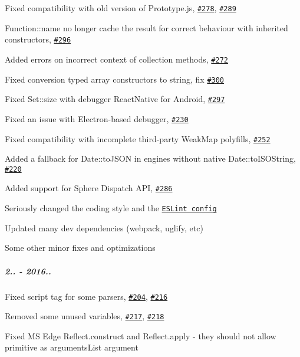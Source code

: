 \begin{DoxyItemize}
\item Fixed compatibility with old version of Prototype.\+js, \href{https://github.com/zloirock/core-js/issues/278}{\tt \#278}, \href{https://github.com/zloirock/core-js/issues/289}{\tt \#289}
\item {\ttfamily Function\+::name} no longer cache the result for correct behaviour with inherited constructors, \href{https://github.com/zloirock/core-js/issues/296}{\tt \#296}
\item Added errors on incorrect context of collection methods, \href{https://github.com/zloirock/core-js/issues/272}{\tt \#272}
\item Fixed conversion typed array constructors to string, fix \href{https://github.com/zloirock/core-js/issues/300}{\tt \#300}
\item Fixed {\ttfamily Set\+::size} with debugger React\+Native for Android, \href{https://github.com/zloirock/core-js/issues/297}{\tt \#297}
\item Fixed an issue with Electron-\/based debugger, \href{https://github.com/zloirock/core-js/issues/230}{\tt \#230}
\item Fixed compatibility with incomplete third-\/party {\ttfamily Weak\+Map} polyfills, \href{https://github.com/zloirock/core-js/pull/252}{\tt \#252}
\item Added a fallback for {\ttfamily Date\+::to\+J\+S\+ON} in engines without native {\ttfamily Date\+::to\+I\+S\+O\+String}, \href{https://github.com/zloirock/core-js/issues/220}{\tt \#220}
\item Added support for Sphere Dispatch A\+PI, \href{https://github.com/zloirock/core-js/pull/286}{\tt \#286}
\item Seriously changed the coding style and the \href{https://github.com/zloirock/core-js/blob/master/.eslintrc.js}{\tt E\+S\+Lint config}
\item Updated many dev dependencies ({\ttfamily webpack}, {\ttfamily uglify}, etc)
\item Some other minor fixes and optimizations
\end{DoxyItemize}

\subparagraph*{2.. -\/ 2016..}


\begin{DoxyItemize}
\item Fixed {\ttfamily script} tag for some parsers, \href{https://github.com/zloirock/core-js/issues/204}{\tt \#204}, \href{https://github.com/zloirock/core-js/issues/216}{\tt \#216}
\item Removed some unused variables, \href{https://github.com/zloirock/core-js/issues/217}{\tt \#217}, \href{https://github.com/zloirock/core-js/issues/218}{\tt \#218}
\item Fixed MS Edge {\ttfamily Reflect.\+construct} and {\ttfamily Reflect.\+apply} -\/ they should not allow primitive as {\ttfamily arguments\+List} argument
\end{DoxyItemize}

